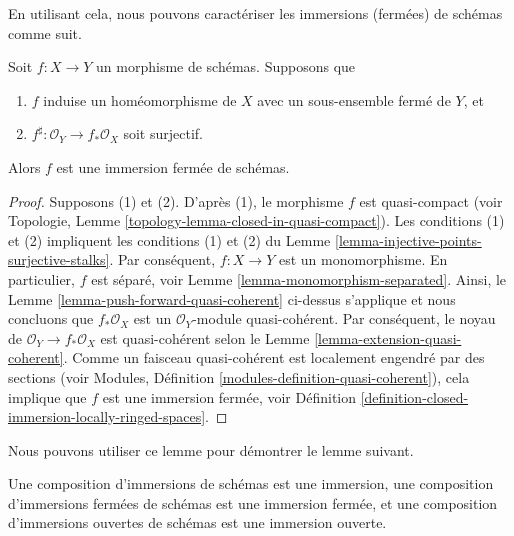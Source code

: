 \noindent
En utilisant cela, nous pouvons caractériser les immersions (fermées) de schémas
comme suit.

\begin{lemma}
\label{lemma-characterize-closed-immersions}
Soit  $f : X \to Y$  un morphisme de schémas. Supposons que
\begin{enumerate}
\item $f$  induise un homéomorphisme de  $X$  avec un sous-ensemble fermé
de  $Y$, et
\item $f^\sharp : \mathcal{O}_Y \to f_*\mathcal{O}_X$  soit surjectif.
\end{enumerate}
Alors  $f$  est une immersion fermée de schémas.
\end{lemma}

\begin{proof}
Supposons (1) et (2). D'après (1), le morphisme  $f$  est quasi-compact
(voir Topologie, Lemme  \ref{topology-lemma-closed-in-quasi-compact}). Les conditions (1) et (2) impliquent les
conditions (1) et (2) du Lemme  \ref{lemma-injective-points-surjective-stalks}. Par conséquent,  $f : X \to Y$  est un
monomorphisme. En particulier,  $f$  est séparé, voir Lemme  \ref{lemma-monomorphism-separated}.
Ainsi, le Lemme  \ref{lemma-push-forward-quasi-coherent}  ci-dessus s'applique et nous concluons que
 $f_*\mathcal{O}_X$  est un  $\mathcal{O}_Y$-module quasi-cohérent. Par conséquent, le noyau
de  $\mathcal{O}_Y \to f_*\mathcal{O}_X$  est quasi-cohérent selon le Lemme  \ref{lemma-extension-quasi-coherent}. Comme un faisceau
quasi-cohérent est localement engendré par des sections (voir Modules, Définition
 \ref{modules-definition-quasi-coherent}), cela implique que  $f$  est une immersion fermée, voir
Définition  \ref{definition-closed-immersion-locally-ringed-spaces}.
\end{proof}

\noindent
Nous pouvons utiliser ce lemme pour démontrer le lemme suivant.

\begin{lemma}
\label{lemma-composition-immersion}
Une composition d'immersions de schémas est une immersion, une composition
d'immersions fermées de schémas est une immersion fermée, et une composition
d'immersions ouvertes de schémas est une immersion ouverte.
\end{lemma}

